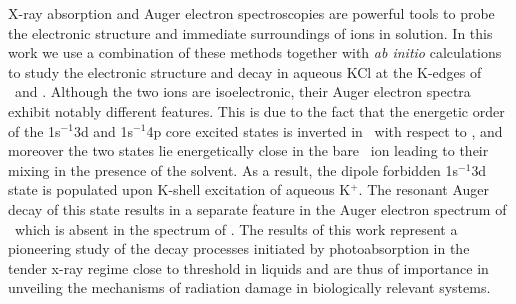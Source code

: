 X-ray absorption and Auger electron spectroscopies are powerful tools to probe the electronic structure and immediate surroundings of ions in solution. In this work we use a combination of these methods together with {\it ab initio} calculations to study the electronic structure and decay in aqueous KCl at the K-edges of \ki~and \cli. Although the two ions are isoelectronic, their Auger electron spectra exhibit notably different features. %
This is due to the fact that the energetic order of the 1s$^{-1}$3d and 1s$^{-1}$4p core excited states is inverted in \ki~with respect to \cli, and moreover the two states lie energetically close in the bare \ki~ion leading to their mixing in the presence of the solvent. As a result, the dipole forbidden 1s$^{-1}$3d state is populated upon K-shell excitation of aqueous K$^{+}$. The resonant Auger decay of this state results in a separate feature in the Auger electron spectrum of \ki~which is absent in the spectrum of \cli. The results of this work represent a pioneering study of the decay processes initiated by photoabsorption in the tender x-ray regime close to threshold in liquids and are thus of importance in unveiling the mechanisms of radiation damage in biologically relevant systems.
